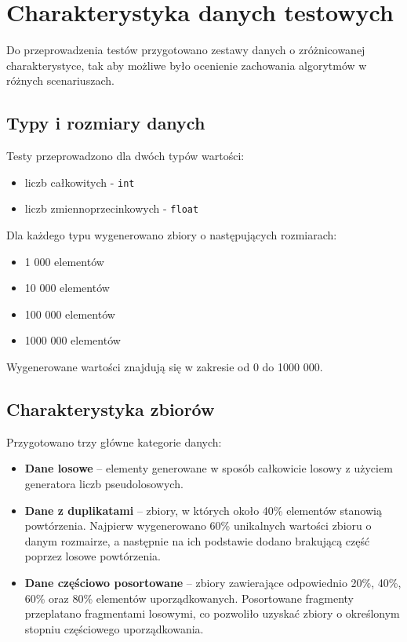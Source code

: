 

\section{Charakterystyka danych testowych}
\label{sec:DaneTestowane}

Do przeprowadzenia testów przygotowano zestawy danych o zróżnicowanej charakterystyce, 
tak aby możliwe było ocenienie zachowania algorytmów w różnych scenariuszach.

\subsection{Typy i rozmiary danych}

Testy przeprowadzono dla dwóch typów wartości:
\begin{itemize}
    \item liczb całkowitych - \texttt{int}
    \item liczb zmiennoprzecinkowych - \texttt{float}
\end{itemize}

Dla każdego typu wygenerowano zbiory o następujących rozmiarach:
\begin{itemize}
    \item 1 000 elementów
    \item 10 000 elementów
    \item 100 000 elementów
    \item 1000 000 elementów
\end{itemize}

Wygenerowane wartości znajdują się w zakresie od 0 do 1000 000.

\subsection{Charakterystyka zbiorów}

Przygotowano trzy główne kategorie danych:

\begin{itemize}
    \item \textbf{Dane losowe} -- elementy generowane w sposób całkowicie losowy 
    z użyciem generatora liczb pseudolosowych.
    
    \item \textbf{Dane z duplikatami} -- zbiory, w których około 40\% elementów stanowią powtórzenia. 
    Najpierw wygenerowano 60\% unikalnych wartości zbioru o danym rozmairze, 
    a następnie na ich podstawie dodano brakującą część poprzez losowe powtórzenia.
    
    \item \textbf{Dane częściowo posortowane} -- zbiory zawierające odpowiednio 20\%, 40\%, 60\% oraz 80\% elementów uporządkowanych. 
    Posortowane fragmenty przeplatano fragmentami losowymi, co pozwoliło uzyskać zbiory o określonym stopniu częściowego uporządkowania.
\end{itemize}

